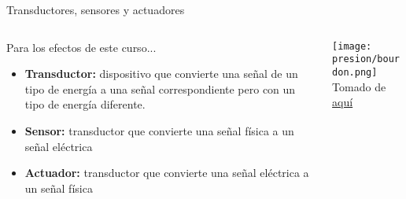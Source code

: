\documentclass[aspectratio=169]{beamer}
\begin{document}
\begin{frame}{Transductores, sensores y actuadores}
    \begin{columns}[c, onlytextwidth]
        \begin{column}{0.6\textwidth}
        Para los efectos de este curso...\\[8pt]
        \begin{itemize}
            \item \textbf{Transductor:} dispositivo que convierte una señal de un tipo de energía a una señal correspondiente pero con un tipo de energía diferente.
            \item \textbf{Sensor:} transductor que convierte una señal física a un señal eléctrica
            \item \textbf{Actuador:} transductor que convierte una señal eléctrica a un señal física
        \end{itemize}
        \end{column}
        \begin{column}{0.4\textwidth}
            \begin{center}
               \texttt{[image: presion/bourdon.png]}\\
               \tiny{Tomado de \href{https://upload.wikimedia.org/wikipedia/commons/thumb/7/74/MAXIMATOR-High-Pressure-Manometer-01a.jpg/1200px-MAXIMATOR-High-Pressure-Manometer-01a.jpg}{aquí}}
            \end{center}
        \end{column}
    \end{columns}
\end{frame}
\end{document}
